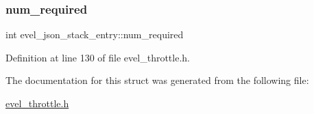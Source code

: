 \subsubsection{\texorpdfstring{num\+\_\+required}{num\_required}}
{\footnotesize\ttfamily int evel\+\_\+json\+\_\+stack\+\_\+entry\+::num\+\_\+required}



Definition at line 130 of file evel\+\_\+throttle.\+h.



The documentation for this struct was generated from the following file\+:\begin{DoxyCompactItemize}
\item 
\hyperlink{evel__throttle_8h}{evel\+\_\+throttle.\+h}\end{DoxyCompactItemize}
